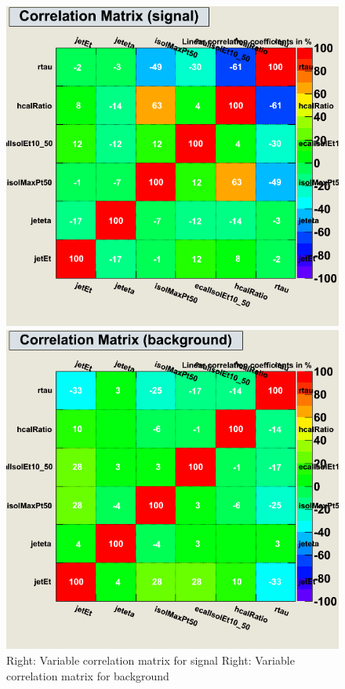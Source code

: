\begin{figure}[h]
 \begin{minipage}{7.0cm}
\includegraphics[width=1.0\textwidth]{images/ahCorrelationMatrixS.png}
\end{minipage}
 \hfill
\begin{minipage}{7.0cm}
\includegraphics[width=1.0\textwidth]{images/ahCorrelationMatrixB.png}
\end{minipage}
\begin{minipage}{3.0cm}
\caption{Right: Variable correlation matrix for signal Right: Variable correlation matrix for background}
\end{minipage}
\label{fig:ahCorrelationMatrix}
\end{figure}



